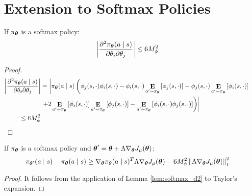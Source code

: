 \chapter{Extension to Softmax Policies}

\begin{lemma}\label{lem:softmax_d2}
If $\pi_{\vtheta}$ is a softmax policy:
\[
\left| \frac{\partial^2\pi_{\vtheta}(a \mid s)}
	{\partial\theta_i\partial\theta_j}\right| \leq
	6M_{\phi}^2
\]
\end{lemma}
\begin{proof}
\begin{align*}
\left|\frac{\partial^2\pi_{\vtheta}(a \mid s)}
		{\partial\theta_i\partial\theta_j}\right|
		&= \left| \pi_{\vtheta}(a\mid s)\left(
		\phi_j(s,\cdot)\phi_i(s,\cdot) -  \phi_i(s,\cdot)\expected{a'}{\pi_{\vtheta}}{\phi_j(s,\cdot)} - \phi_j(s,\cdot)\expected{a'}{\pi_{\vtheta}}{\phi_i(s,\cdot)}\right.\right. \\
		&\left.\left.+ 2\expected{a'}{\pi_{\vtheta}}{\phi_i(s,\cdot)}\expected{a'}{\pi_{\vtheta}}{\phi_j(s,\cdot)} - \expected{a'}{\pi_{\vtheta}}{\phi_i(s,\cdot)\phi_j(s,\cdot)}\right)\right| \\
		\leq 6M_\phi^2
\end{align*}
\end{proof}

\begin{lemma}\label{lem:softmax_diff}
If $\pi_{\vtheta}$ is a softmax policy and $\vtheta' = \vtheta+\Lambda\gradJ{\vtheta}$:
\[
\pi_{\vtheta'}(a \mid s) - \pi_{\vtheta}(a \mid s) \geq 
	\nabla_{\vtheta}\pi_{\vtheta}(a \mid s)^T\Lambda\gradJ{\vtheta} -
	6M_{\phi}^2\norm[1]{\Lambda\gradJ{\vtheta}}^2
\]
\end{lemma}
\begin{proof}
It follows from the application of Lemma \ref{lem:softmax_d2} to Taylor's expansion.
\end{proof}

